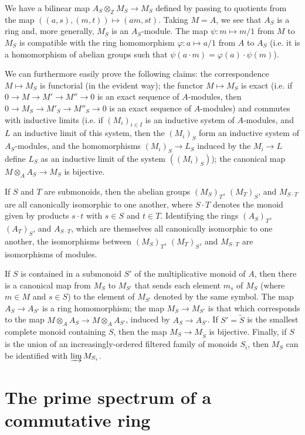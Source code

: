 \documentclass{article}
\theoremstyle{plain}
\newcommand{\oldpage}[1]{\marginpar{\footnotesize$\Big\vert$ \textit{p.~#1}}}
\begin{document}
We have a bilinear map $A_S\otimes_\mathbb{Z}M_S\to M_S$ defined by passing to quotients from the map $((a,s),(m,t))\mapsto(am,st)$.
Taking $M=A$, we see that $A_S$ is a ring and, more generally, $M_S$ is an $A_S$-module.
The map $\psi\colon m\mapsto m/1$ from $M$ to $M_S$ is compatible with the ring homomorphism $\varphi\colon a\mapsto a/1$ from $A$ to $A_S$ (i.e. it is a homomorphism of abelian groups such that $\psi(a\cdot m)=\varphi(a)\cdot\psi(m)$).

We can furthermore easily prove the following claims:
the correspondence $M\mapsto M_S$ is functorial (in the evident way);
the functor $M\mapsto M_S$ is exact (i.e. if $0\to M\to M'\to M''\to 0$ is an exact sequence of $A$-modules, then $0\to M_S\to M'_S\to M''_S\to 0$ is an exact sequence of $A$-modules) and commutes with inductive limits (i.e. if $(M_i)_{i\in I}$ is an inductive system of $A$-modules, and $L$ an inductive limit of this system, then the $(M_i)_S$ form an inductive system of $A_S$-modules, and the homomorphisms $(M_i)_S\to L_S$ induced by the $M_i\to L$ define $L_S$ as an inductive limit of the system $((M_i)_S)$); the canonical map $M\otimes_A A_S\to M_S$ is bijective.

If $S$ and $T$ are submonoids, then the abelian groups $(M_S)_T$, $(M_T)_S$, and $M_{S\cdot T}$ are all canonically isomorphic to one another, where $S\cdot T$ denotes the monoid given by products $s\cdot t$ with $s\in S$ and $t\in T$.
Identifying the rings $(A_S)_T$, $(A_T)_S$, and $A_{S\cdot T}$, which are themselves all canonically isomorphic to one another, the isomorphisms between $(M_S)_T$, $(M_T)_S$, and $M_{S\cdot T}$ are isomorphisms of modules.

\oldpage{1-03}
If $S$ is contained in a submonoid $S'$ of the multiplicative monoid of $A$, then there is a canonical map from $M_S$ to $M_{S'}$ that sends each element $m_s$ of $M_S$ (where $m\in M$ and $s\in S$) to the element of $M_{S'}$ denoted by the same symbol.
The map $A_S\to A_{S'}$ is a ring homomorphism;
the map $M_S\to M_{S'}$ is that which corresponds to the map $M\otimes_A A_S\to M\otimes_A A_{S'}$, induced by $A_S\to A_{S'}$.
If $S'=\widetilde{S}$ is the smallest complete monoid containing $S$, then the map $M_S\to M_{\widetilde{S}}$ is bijective.
Finally, if $S$ is the union of an increasingly-ordered filtered family of monoids $S_i$, then $M_S$ can be identified with $\varinjlim M_{S_i}$.


\section{The prime spectrum of a commutative ring}
\label{section2}
\end{document}
